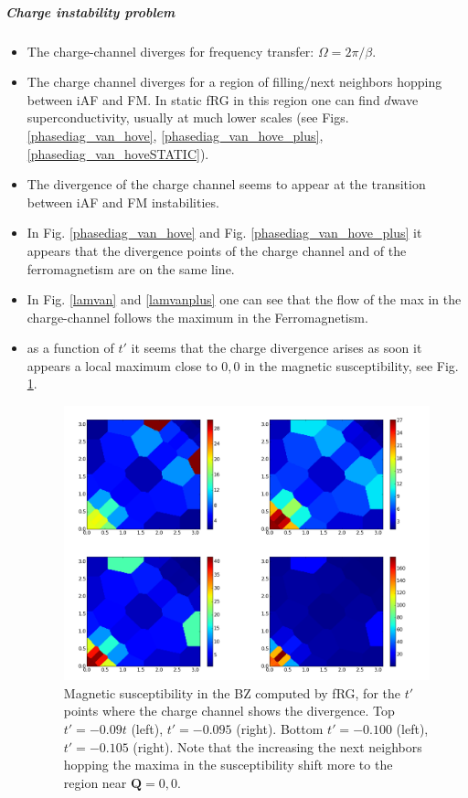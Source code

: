 \subparagraph{Charge instability problem}
 
\begin{itemize}
\item The charge-channel diverges for frequency transfer: $\Omega=2\pi/\beta$. 


\item The charge channel diverges for a region of filling/next neighbors hopping between iAF and FM. In static fRG in this region one can find $d$wave superconductivity, usually at much lower scales (see Figs. \ref{phasediag_van_hove}, \ref{phasediag_van_hove_plus}, \ref{phasediag_van_hoveSTATIC}).


\item The divergence of the charge channel seems to appear at the transition between iAF and FM instabilities. 

\item In Fig. \ref{phasediag_van_hove} and Fig. \ref{phasediag_van_hove_plus} it appears that the divergence points of the charge channel and of the ferromagnetism are on the same line. 

\item In Fig. \ref{lamvan} and \ref{lamvanplus} one can see that the flow of the max in the charge-channel follows the maximum in the Ferromagnetism. 

\item as a function of $t'$ it seems that the charge divergence arises as soon it appears a local maximum close to $0,0$ in the magnetic susceptibility, see Fig. \ref{susceptibilityfrg}. 
\begin{figure}
\includegraphics[scale=0.25]{images/susceptibilityfrg.png}
\caption{ Magnetic susceptibility  in the BZ computed by fRG, for the $t'$ points where the charge channel shows the divergence. 
Top $t'=-0.09t$ (left), $t'=-0.095$ (right). Bottom $t'=-0.100$ (left), $t'=-0.105$ (right). Note that the increasing the next neighbors hopping the maxima in the susceptibility shift more to the region near $\mathbf{Q} = 0,0$.
 } 
\label{susceptibilityfrg} 
\end{figure}
 

\end{itemize}
